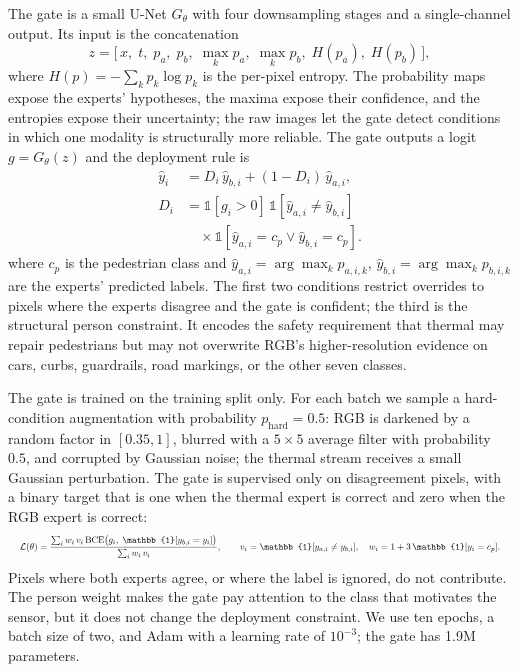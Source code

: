 The gate is a small U-Net $G_\theta$ with four downsampling stages and a
single-channel output. Its input is the concatenation
\begin{equation}
  z = \bigl[\,x,\; t,\; p_a,\; p_b,\; \max_k p_a,\; \max_k p_b,\; H(p_a),\; H(p_b)\,\bigr],
  \label{eq:features}
\end{equation}
where $H(p)=-\sum_k p_k\log p_k$ is the per-pixel entropy. The probability maps expose
the experts' hypotheses, the maxima expose their confidence, and the entropies expose
their uncertainty; the raw images let the gate detect conditions in which one modality
is structurally more reliable. The gate outputs a logit $g=G_\theta(z)$ and the
deployment rule is
\begin{equation}
\begin{aligned}
\hat{y}_i &= D_i\,\hat{y}_{b,i} + (1-D_i)\,\hat{y}_{a,i},\\
D_i &= \mathbb{1}[g_i>0]\,\mathbb{1}[\hat{y}_{a,i}\ne\hat{y}_{b,i}]\\
&\quad\times \mathbb{1}[\hat{y}_{a,i}=c_p \lor \hat{y}_{b,i}=c_p].
\end{aligned}
\label{eq:deploy}
\end{equation}
where $c_p$ is the pedestrian class and $\hat y_{a,i}=\arg\max_k p_{a,i,k}$, $\hat y_{b,i}=\arg\max_k p_{b,i,k}$ are the experts' predicted labels. The first two conditions restrict overrides to
pixels where the experts disagree and the gate is confident; the third is the
structural person constraint. It encodes the safety requirement that thermal may
repair pedestrians but may not overwrite RGB's higher-resolution evidence on cars,
curbs, guardrails, road markings, or the other seven classes.

The gate is trained on the training split only. For each batch we sample a
hard-condition augmentation with probability $p_{\text{hard}}=0.5$: RGB is darkened by
a random factor in $[0.35,1]$, blurred with a $5\times5$ average filter with
probability $0.5$, and corrupted by Gaussian noise; the thermal stream receives a small
Gaussian perturbation. The gate is supervised only on disagreement pixels, with a
binary target that is one when the thermal expert is correct and zero when the RGB
expert is correct:
\begin{equation}
\resizebox{\columnwidth}{!}{$\displaystyle
  \mathcal{L}(\theta) =
  \frac{\sum_i w_i\,v_i\,
  \mathrm{BCE}\bigl(g_i,\;\mathbb{1}[y_{b,i}=y_i]\bigr)}
  {\sum_i w_i\,v_i},
  \qquad
  v_i=\mathbb{1}[y_{a,i}\ne y_{b,i}],\quad
  w_i=1+3\,\mathbb{1}[y_i=c_p].$}
  \label{eq:loss}
\end{equation}
Pixels where both experts agree, or where the label is ignored, do not contribute. The
person weight makes the gate pay attention to the class that motivates the sensor, but
it does not change the deployment constraint. We use ten epochs, a batch size of two,
and Adam with a learning rate of $10^{-3}$; the gate has 1.9M parameters.

